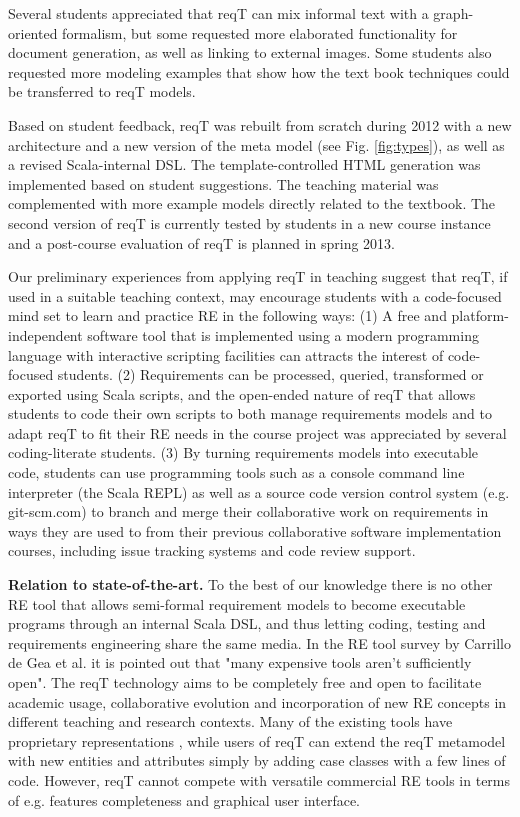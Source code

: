 \documentclass[a4paper]{llncs}
\begin{document}
Several students appreciated that reqT can mix informal text with a graph-oriented formalism, but some requested more elaborated functionality for document generation, as well as linking to external images. Some students also requested more modeling examples that show how the text book techniques could be transferred to reqT models. 

Based on student feedback, reqT was rebuilt from scratch during 2012 with a new architecture and a new version of the meta model (see Fig. \ref{fig:types}), as well as a revised Scala-internal DSL. The template-controlled HTML generation was implemented based on student suggestions. The teaching material was complemented with more example models directly related to the textbook. The second version of reqT is currently tested by  students in a new course instance and a post-course evaluation of reqT is planned in spring 2013. 

Our preliminary experiences from applying reqT in teaching suggest that reqT, if used in a suitable teaching context, may encourage students with a code-focused mind set to learn and practice RE in the following ways: (1) A free and platform-independent software tool that is implemented using a modern programming language with interactive scripting facilities can attracts the interest of code-focused students. (2) Requirements can be processed, queried, transformed or exported using Scala scripts, and the open-ended nature of reqT that allows students to code their own scripts to both manage requirements models and to adapt reqT to fit their RE needs in the course project was appreciated by several coding-literate students. (3) By turning requirements models into executable code, students can use programming tools such as a console command line interpreter (the Scala REPL) as well as a source code version control system (e.g. git-scm.com) to branch and merge their collaborative work on requirements in ways they are used to from their previous collaborative software implementation courses, including issue tracking systems and code review support.

{\bf Relation to state-of-the-art.} To the best of our knowledge there is no other RE tool that allows semi-formal requirement models to become executable programs through an internal Scala DSL, and thus letting coding, testing and requirements engineering share the same media. In the RE tool survey by Carrillo de Gea et al.  \cite{Carillo2011} it is pointed out that "many expensive tools aren't sufficiently open". The reqT technology aims to be completely free and open to facilitate academic usage, collaborative evolution and incorporation of new RE concepts in different teaching and research contexts. Many of the existing tools have proprietary representations \cite{Carillo2011}, while users of reqT can extend the reqT metamodel with new entities and attributes simply by adding case classes with a few lines of code. However, reqT cannot compete with versatile commercial RE tools  \cite{Carillo2011}  in terms of e.g. features completeness and graphical user interface. 
 
\end{document}
